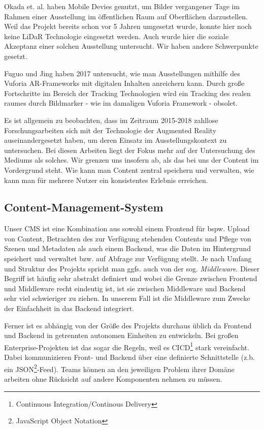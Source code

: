 \documentclass[titlepage, a4paper, 11pt]{scrartcl}
\begin{document}
      Okada et. al. haben Mobile Devies genutzt, um Bilder vergangener Tage im Rahmen einer Ausstellung im öffentlichen Raum auf Oberflächen darzustellen\cite{okada2015manseibashi}.
      Weil das Projekt bereits schon vor 5 Jahren umgesetzt wurde, konnte hier noch keine LiDaR Technologie eingesetzt werden. 
      Auch wurde hier die soziale Akzeptanz einer solchen Ausstellung untersucht. Wir haben andere Schwerpunkte gesetzt.

      Fuguo und Jing haben 2017 untersucht, wie man Ausstellungen mithilfe des Vuforia AR-Frameworks mit digitalen Inhalten anreichern kann\cite{peng2017mobile}. Durch große Fortschritte
      im Bereich der Tracking Technologien wird ein Tracking des realen raumes durch Bildmarker - wie im damaligen Vuforia Framework - obsolet.

      Es ist allgemein zu beobachten, dass im Zeitraum 2015-2018 zahllose Forschungsarbeiten sich mit der Technologie der Augmented Reality auseinandergesetzt haben,
      um deren Einsatz im Ausstellungskontext zu untersuchen. Bei diesen Arbeiten liegt der Fokus mehr auf der Untersuchung des Mediums als solches. Wir grenzen uns insofern ab,
      als das bei uns der Content im Vordergrund steht. Wie kann man Content zentral speichern und verwalten, wie kann man für mehrere Nutzer ein konsistentes Erlebnis 
      erreichen.    


    \subsection{Content-Management-System}

      Unser CMS ist eine Kombination aus sowohl einem Frontend für bspw. Upload von Content, Betrachten des zur Verfügung stehenden Contents und Pflege von Szenen und Metadaten 
      als auch einem Backend, was die Daten im Hintergrund speichert und verwaltet bzw. auf Abfrage zur Verfügung stellt. Je nach Umfang und Struktur des Projekts spricht man ggfs. auch 
      von der sog. \textit{Middleware}. Dieser Begriff ist häufig sehr abstrakt definiert und wobei die Grenze zwischen Frontend und Middleware recht eindeutig ist,
      ist sie zwischen Middleware und Backend sehr viel schwieriger zu ziehen. In unserem Fall ist die Middleware zum Zwecke der Einfachheit in das Backend integriert.

      Ferner ist es abhängig von der Größe des Projekts durchaus üblich da Frontend und Backend in getrennten autonomen Einheiten zu entwickeln. 
      Bei großen Enterprise-Projekten ist das sogar die Regeln, weil es CICD\footnote{Continuous Integration/Continous Delivery} stark vereinfacht.
      Dabei kommunizieren Front- und Backend über eine definierte Schnittstelle (z.b. ein JSON\footnote{JavaScript Object Notation}-Feed).
      Teams können an den jeweiligen Problem ihrer Domäne arbeiten ohne Rücksicht auf andere Komponenten nehmen zu müssen.
\end{document}
